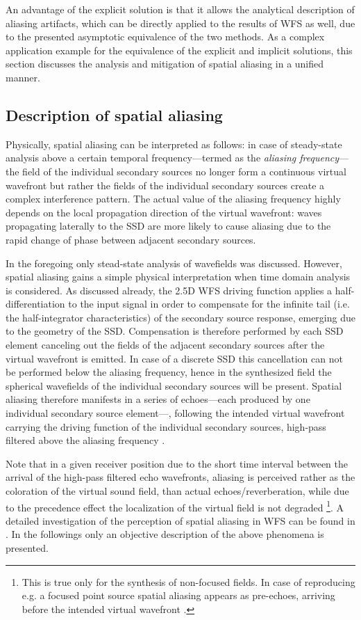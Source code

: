 An advantage of the explicit solution is that it allows the analytical description of aliasing artifacts, which can be directly applied to the results of WFS as well, due to the presented asymptotic equivalence of the two methods.
As a complex application example for the equivalence of the explicit and implicit solutions, this section discusses the analysis and mitigation of spatial aliasing in a unified manner.

\subsection{Description of spatial aliasing}

Physically, spatial aliasing can be interpreted as follows: in case of steady-state analysis above a certain temporal frequency---termed as the \emph{aliasing frequency}--- the field of the individual secondary sources no longer form a continuous virtual wavefront but rather the fields of the individual secondary sources create a complex interference pattern.
The actual value of the aliasing frequency highly depends on the local propagation direction of the virtual wavefront: waves propagating laterally to the SSD are more likely to cause aliasing due to the rapid change of phase between adjacent secondary sources.

In the foregoing only stead-state analysis of wavefields was discussed.
However, spatial aliasing gains a simple physical interpretation when time domain analysis is considered.
As discussed already, the 2.5D WFS driving function applies a half-differentiation to the input signal in order to compensate for the infinite tail (i.e. the half-integrator characteristics) of the secondary source response, emerging due to the geometry of the SSD.
Compensation is therefore performed by each SSD element canceling out the fields of the adjacent secondary sources after the virtual wavefront is emitted.
In case of a discrete SSD this cancellation can not be performed below the aliasing frequency, hence in the synthesized field the spherical wavefields of the individual secondary sources will be present.
Spatial aliasing therefore manifests in a series of echoes---each produced by one individual secondary source element---, following the intended virtual wavefront carrying the driving function of the individual secondary sources, high-pass filtered above the aliasing frequency \cite{spors2009spatial}. 

Note that in a given receiver position due to the short time interval between the arrival of the high-pass filtered echo wavefronts, aliasing is perceived rather as the coloration of the virtual sound field, than actual echoes/reverberation, while due to the precedence effect the localization of the virtual field is not degraded \footnote{This is true only for the synthesis of non-focused fields.
In case of reproducing e.g. a focused point source spatial aliasing appears as pre-echoes, arriving before the intended virtual wavefront \cite{Spors2009:FocusedSourceAliasing}.}.
A detailed investigation of the perception of spatial aliasing in WFS can be found in \cite{8371275}.
In the followings only an objective description of the above phenomena is presented.

